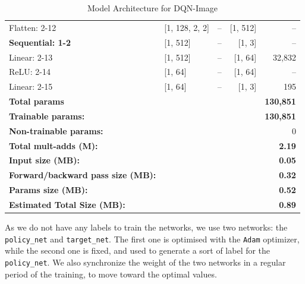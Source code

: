 \begin{table}
\begin{adjustbox}{max width=\linewidth}
\begin{tabular}{@{}llcrr@{}}
		\quad \quad Flatten: 2-12                & [1, 128, 2, 2]   & --            & [1, 512]         & --     \\
		\quad \textbf{Sequential: 1-2}                   & [1, 512]         & --            & [1, 3]           & --     \\
		\quad \quad Linear: 2-13                 & [1, 512]         & --            & [1, 64]          & 32,832 \\
		\quad \quad ReLU: 2-14                   & [1, 64]          & --            & [1, 64]          & --     \\
		\quad \quad Linear: 2-15                 & [1, 64]          & --            & [1, 3]           & 195    \\
		\midrule
		\textbf{Total params}                              &                   &              &                   & \textbf{130,851}\\
		\textbf{Trainable params:}                         &                   &              &                   & \textbf{130,851}\\
		\textbf{Non-trainable params:}                     &                   &              &                   & 0      \\
		\textbf{Total mult-adds (M):}                      &                   &              &                   & \textbf{2.19}   \\
		\midrule
		\textbf{Input size (MB):}                          &                   &              &                   & \textbf{0.05}    \\
		\textbf{Forward/backward pass size (MB):}          &                   &              &                   & \textbf{0.32}    \\
		\textbf{Params size (MB):}                         &                   &              &                   & \textbf{0.52}     \\
		\textbf{Estimated Total Size (MB):}                &                   &              &                   & \textbf{0.89}     \\
		\bottomrule
	\end{tabular}
	\end{adjustbox}
	\caption{Model Architecture for DQN-Image}
	\label{tab:cnn-dqn}
\end{table}




As we do not have any labels to train the networks, we use two networks: the \texttt{policy\_net} and \texttt{target\_net}. The first one is optimised with the \texttt{Adam} optimizer, while the second one is fixed, and used to generate a sort of label for the \texttt{policy\_net}. We also synchronize the weight of the two networks in a regular period of the training, to move toward the optimal values.


